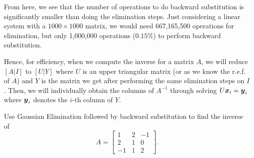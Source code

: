 From here, we see that the number of operations to do backward substitution is significantly smaller than doing the elimination steps.
Just considering a linear system with a $1000 \times 1000$ matrix, we would need 667,165,500 operations for elimination, but only 1,000,000 operations ($0.15\%$) to perform backward substitution.

Hence, for efficiency, when we compute the inverse for a matrix $A$, we will reduce $[A|I]$ to $[U|Y]$ where $U$ is an upper triangular matrix (or as we know the r.e.f. of $A$) and $Y$ is the matrix we get after performing the same elimination steps on $I$.
Then, we will individually obtain the columns of $A^{-1}$ through solving $U\boldsymbol{x}_i=\boldsymbol{y}_i$ where $\boldsymbol{y}_i$ denotes the $i$-th column of $Y$.

\begin{example}
Use Gaussian Elimination followed by backward substitution to find the inverse of
\[
 A=\begin{bmatrix}
 1&2&-1\\
 2&1&0\\
 -1&1&2
 \end{bmatrix}.
\]
\end{example}


